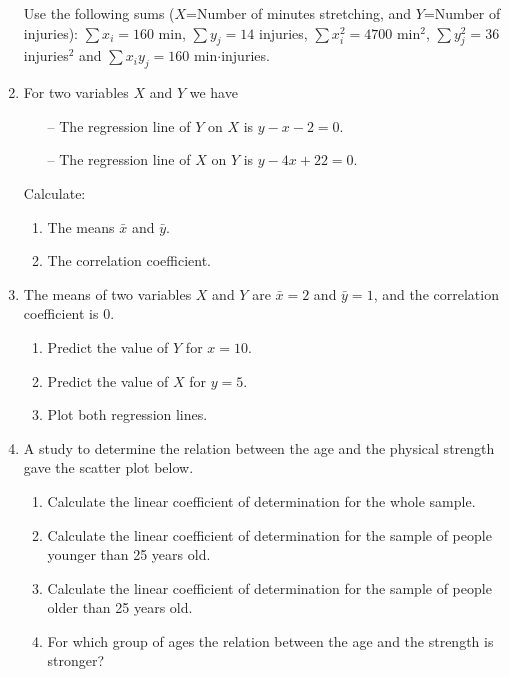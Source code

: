 \begin{enumerate}[leftmargin=*,resume]
Use the following sums ($X$=Number of minutes stretching, and $Y$=Number of injuries):
$\sum x_i = 160$ min, $\sum y_j=14$ injuries, $\sum x_i^2= 4700$ min$^2$, $\sum y_j^2=36$ injuries$^2$ and $\sum
x_iy_j=160$  min$\cdot$injuries.

\item For two variables $X$ and $Y$ we have
\begin{itemize}
\item[--] The regression line of $Y$ on $X$ is $y-x-2=0$.
\item[--] The regression line of $X$ on $Y$ is $y-4x+22=0$.
\end{itemize}
Calculate:
\begin{enumerate}
\item The means $\bar x$ and $\bar y$.
\item The correlation coefficient.
\end{enumerate}

\item The means of two variables $X$ and $Y$ are $\bar x=2$ and $\bar y=1$, and the correlation coefficient is 0.
\begin{enumerate}
\item  Predict the value of $Y$ for $x=10$.
\item  Predict the value of $X$ for $y=5$.
\item  Plot both regression lines.
\end{enumerate}

\item A study to determine the relation between the age and the physical strength gave the scatter plot
below.
\begin{center}
\resizebox{0.7\textwidth}{!}{}
\end{center}

\begin{enumerate}
\item Calculate the linear coefficient of determination for the whole sample.
\item Calculate the linear coefficient of determination for the sample of people younger than 25 years old. 
\item Calculate the linear coefficient of determination for the sample of people older than 25 years old.
\item For which group of ages the relation between the age and the strength is stronger? 
\end{enumerate}


\end{enumerate}
